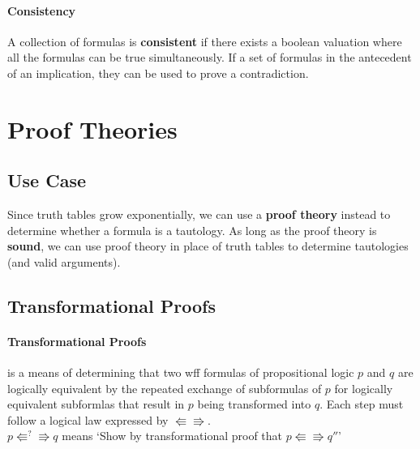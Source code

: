 \documentclass[12pt]{report}
\begin{document}
        \paragraph{Consistency} A collection of formulas is \textbf{consistent}
        if there exists a boolean valuation where all the formulas can be true
        simultaneously. If a set of formulas in the antecedent of an
        implication, they can be used to prove a contradiction.

  \section{Proof Theories}
    \subsection{Use Case}
      Since truth tables grow exponentially, we can use a \textbf{proof theory}
      instead to determine whether a formula is a tautology. As long as the
      proof theory is \textbf{sound}, we can use proof theory in place of truth
      tables to determine tautologies (and valid arguments).

    \subsection{Transformational Proofs}
      \paragraph{Transformational Proofs} is a means of determining that two
      wff formulas of propositional logic $p$ and $q$ are logically equivalent
      by the repeated exchange of subformulas of $p$ for logically equivalent
      subformlas that result in $p$ being transformed into $q$. Each step must
      follow a logical law expressed by $\Lleftarrow\Rrightarrow$.\\
      $p\Lleftarrow^?\Rrightarrow q$ means `Show by transformational proof that
      $p\Lleftarrow\Rrightarrow q''$'
\end{document}
